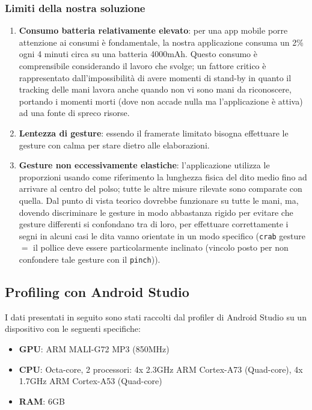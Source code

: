 \subsubsection{Limiti della nostra soluzione}
\begin{enumerate}
    \item \textbf{Consumo batteria relativamente elevato}: per una app mobile porre attenzione ai consumi è fondamentale, la nostra applicazione consuma un 2\% ogni 4 minuti circa su una batteria 4000mAh. Questo consumo è comprensibile considerando il lavoro che svolge; un fattore critico è rappresentato dall'impossibilità di avere momenti di stand-by in quanto il tracking delle mani lavora anche quando non vi sono mani da riconoscere, portando i momenti morti (dove non accade nulla ma l'applicazione è attiva) ad una fonte di spreco risorse.
    \item \textbf{Lentezza di gesture}: essendo il framerate limitato bisogna effettuare le gesture con calma per stare dietro alle elaborazioni.
    \item \textbf{Gesture non eccessivamente elastiche}: l'applicazione utilizza le proporzioni usando come riferimento la lunghezza fisica del dito medio fino ad arrivare al centro del polso; tutte le altre misure rilevate sono comparate con quella. Dal punto di vista teorico dovrebbe funzionare su tutte le mani, ma, dovendo discriminare le gesture in modo abbastanza rigido per evitare che gesture differenti si confondano tra di loro, per effettuare correttamente i segni in alcuni casi le dita vanno orientate in un modo specifico (\texttt{crab} gesture $=$ il pollice deve essere particolarmente inclinato (vincolo posto per non confondere tale gesture con il \texttt{pinch})).
\end{enumerate}

\subsection{Profiling con Android Studio}
I dati presentati in seguito sono stati raccolti dal profiler di Android Studio su un dispositivo con le seguenti specifiche:
\begin{itemize}
    \item \textbf{GPU}: ARM MALI-G72 MP3 (850MHz)
    \item \textbf{CPU}: Octa-core, 2 processori: 4x 2.3GHz ARM Cortex-A73 (Quad-core), 4x 1.7GHz ARM Cortex-A53 (Quad-core)
    \item \textbf{RAM}: 6GB
\end{itemize}

